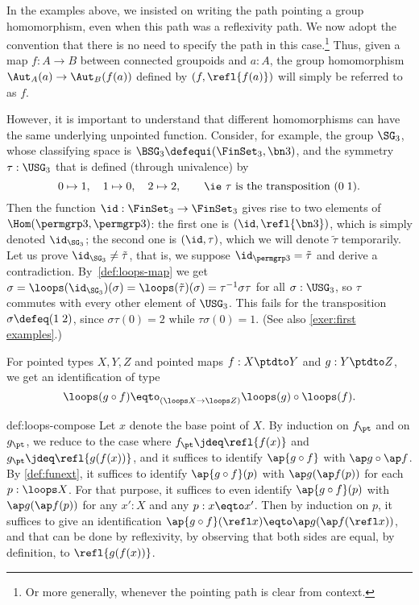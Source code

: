 \begin{remark}
  In the examples above, we insisted on writing the path pointing a group
  homomorphism, even when this path was a reflexivity path. We now adopt
  the convention that there is no need to specify the path in this case.\footnote{%
    Or more generally, whenever the pointing path is clear from context.}
  Thus, given a
  map $f:A \to B$ between connected groupoids and $a:A$, the group
  homomorphism $\Aut_A(a) \to \Aut_B(f(a))$ defined by
  $(f,\refl{f(a)})$ will simply be referred to as $f$.

  However, it is important to understand that different homomorphisms
  can have the same underlying unpointed function. Consider, for
  example, the group $\SG_3$, whose classifying space is
  $\BSG_3\defequi (\FinSet_3,\bn 3)$, and the symmetry
  $\tau:\USG_3$ that is defined (through
  univalence) by
  \[
    0\mapsto 1,\quad 1\mapsto 0,\quad 2 \mapsto 2, \qquad
    \text{\ie $\tau$ is the transposition $(0\; 1)$.}
  \]
  Then the function $\id: \FinSet_3 \to \FinSet_3$ gives rise to two
  elements of $\Hom(\permgrp 3,\permgrp 3)$: the first one is
  $(\id,\refl{\bn 3})$, which is simply denoted $\id_{\SG_3}$;
  the second one is $(\id,\tau)$, which we will denote $\tilde\tau$
  temporarily. Let us prove $\id_{\SG_3} \neq \tilde \tau$, that
  is, we suppose $\id_{\permgrp 3} = \tilde \tau$
  and derive a
  contradiction. By~\cref{def:loops-map} we get
  $\sigma = \loops(\id_{\SG_3})(\sigma) = \loops(\tilde \tau)(\sigma) 
          = \tau^{-1} \sigma \tau$ for all $\sigma : \USG_3$,
  so $\tau$ commutes with every other element of
  $\USG_3$. This fails for the transposition $\sigma \defeq (1\;2)$,
  since $\sigma\tau(0) = 2$ while $\tau\sigma(0) = 1$. (See also
  \cref{exer:first examples}.)
\end{remark}

\begin{construction}\label{def:loops-compose}
  For pointed types $X,Y,Z$ and pointed maps $f : X \ptdto Y$
  and $g : Y \ptdto Z$, we get an identification of type
  \[
    \loops(g \circ f) \eqto_{(\loops X \to \loops Z)}
    \loops(g) \circ \loops(f).
  \]
\end{construction}

\begin{implementation}{def:loops-compose}
  Let $x$ denote the base point of $X$.
  By induction on $f_\pt$ and on $g_\pt$, we reduce to the case where $f_\pt \jdeq \refl{f(x)}$
  and $g_\pt \jdeq \refl{g(f(x))}$, and it suffices to identify $\ap{g \circ f}$ with $\ap g \circ \ap f$.
  By \cref{def:funext}, it suffices to identify $\ap{g \circ f}(p)$ with $\ap g ( \ap f (p))$ for each $p : \loops X$.
  For that purpose, it suffices to even identify $\ap{g \circ f}(p)$ with $\ap g ( \ap f (p))$ for any $x' : X$ and any $p : x \eqto x'$.
  Then by induction on $p$, it suffices to give an identification
  $\ap{g \circ f}(\refl x) \eqto \ap g ( \ap f (\refl x))$, and that can
  be done by reflexivity,
  by observing that both sides are equal, by definition, to $\refl{g(f(x))}$.
\end{implementation}

